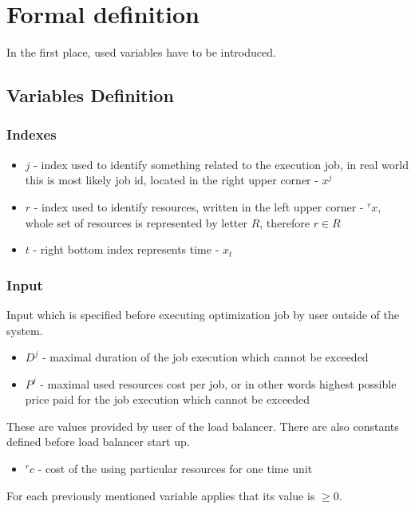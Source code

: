 
\section{Formal definition}\label{sec:formal-definition}
In the first place, used variables have to be introduced.

\subsection{Variables Definition}\label{subsec:variables-definition}

\subsubsection{Indexes}
\begin{itemize}
    \item $j$ - index used to identify something related to the execution job, in real world this is most likely job id, located in the right upper corner - $x^{j}$
    \item $r$ - index used to identify resources, written in the left upper corner - ${}^{r}x$, whole set of resources is represented by letter $R$, therefore $r \in R$
    \item $t$ - right bottom index represents time - $x_t$
\end{itemize}

\subsubsection{Input}
Input which is specified before executing optimization job by user outside of the system.

\begin{itemize}
    \item $D^{j}$ - maximal duration of the job execution which cannot be exceeded
    \item $P^{j}$ - maximal used resources cost per job, or in other words highest possible price paid for the job execution which cannot be exceeded
\end{itemize}
These are values provided by user of the load balancer.
There are also constants defined before load balancer start up.
\begin{itemize}
    \item ${}^{r}c$ - cost of the using particular resources for one time unit
\end{itemize}
For each previously mentioned variable applies that its value is $\geq 0$.

